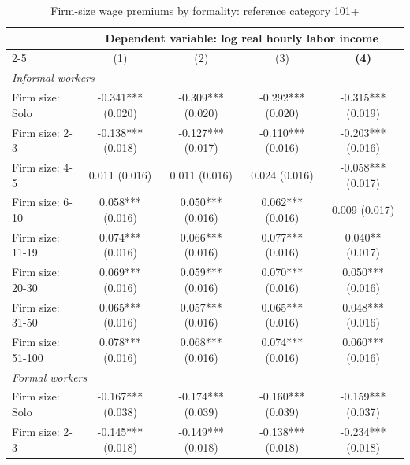 \begin{table}[htbp]
  \centering
  \caption{Firm-size wage premiums by formality: reference category 101+}
  \label{tab:firm-size-local-geography-formality-robustness-101-reference}
  \scriptsize
  \begin{tabular}{lcccc}
    \toprule
    & \multicolumn{4}{c}{Dependent variable: log real hourly labor income} \\
    \cmidrule(lr){2-5}
    & (1) & (2) & (3) & \textbf{(4)} \\
    \midrule
    \multicolumn{5}{l}{\textit{Informal workers}} \\
    Firm size: Solo & -0.341*** {\scriptsize (0.020)} & -0.309*** {\scriptsize (0.020)} & -0.292*** {\scriptsize (0.020)} & -0.315*** {\scriptsize (0.019)} \\
    Firm size: 2-3 & -0.138*** {\scriptsize (0.018)} & -0.127*** {\scriptsize (0.017)} & -0.110*** {\scriptsize (0.016)} & -0.203*** {\scriptsize (0.016)} \\
    Firm size: 4-5 & 0.011 {\scriptsize (0.016)} & 0.011 {\scriptsize (0.016)} & 0.024 {\scriptsize (0.016)} & -0.058*** {\scriptsize (0.017)} \\
    Firm size: 6-10 & 0.058*** {\scriptsize (0.016)} & 0.050*** {\scriptsize (0.016)} & 0.062*** {\scriptsize (0.016)} & 0.009 {\scriptsize (0.017)} \\
    Firm size: 11-19 & 0.074*** {\scriptsize (0.016)} & 0.066*** {\scriptsize (0.016)} & 0.077*** {\scriptsize (0.016)} & 0.040** {\scriptsize (0.017)} \\
    Firm size: 20-30 & 0.069*** {\scriptsize (0.016)} & 0.059*** {\scriptsize (0.016)} & 0.070*** {\scriptsize (0.016)} & 0.050*** {\scriptsize (0.016)} \\
    Firm size: 31-50 & 0.065*** {\scriptsize (0.016)} & 0.057*** {\scriptsize (0.016)} & 0.065*** {\scriptsize (0.016)} & 0.048*** {\scriptsize (0.016)} \\
    Firm size: 51-100 & 0.078*** {\scriptsize (0.016)} & 0.068*** {\scriptsize (0.016)} & 0.074*** {\scriptsize (0.016)} & 0.060*** {\scriptsize (0.016)} \\
    \midrule
    \multicolumn{5}{l}{\textit{Formal workers}} \\
    Firm size: Solo & -0.167*** {\scriptsize (0.038)} & -0.174*** {\scriptsize (0.039)} & -0.160*** {\scriptsize (0.039)} & -0.159*** {\scriptsize (0.037)} \\
    Firm size: 2-3 & -0.145*** {\scriptsize (0.018)} & -0.149*** {\scriptsize (0.018)} & -0.138*** {\scriptsize (0.018)} & -0.234*** {\scriptsize (0.018)} \\

\end{tabular}
\end{table}
